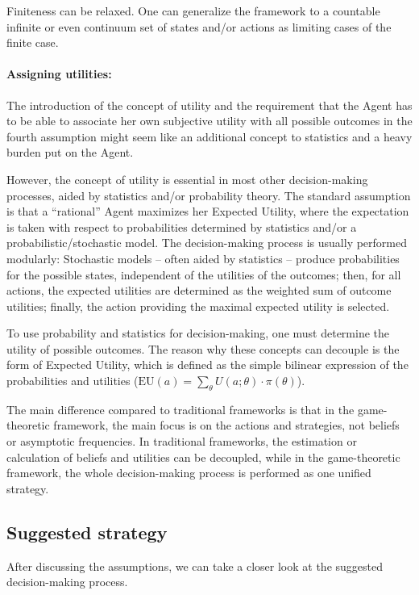 \documentclass{article}
\begin{document}
Finiteness can be relaxed. One can generalize the framework to a countable infinite or even continuum set of states and/or actions as limiting cases of the finite case.

\paragraph{Assigning utilities:}
The introduction of the concept of utility and the requirement that the Agent has to be able to associate her own subjective utility with all possible outcomes in the fourth assumption might seem like an additional concept to statistics and a heavy burden put on the Agent.

However, the concept of utility is essential in most other decision-making processes, aided by statistics and/or probability theory. The standard assumption is that a ``rational'' Agent maximizes her Expected Utility, where the expectation is taken with respect to probabilities determined by statistics and/or a probabilistic/stochastic model. The decision-making process is usually performed modularly: Stochastic models – often aided by statistics – produce probabilities for the possible states, independent of the utilities of the outcomes; then, for all actions, the expected utilities are determined as the weighted sum of outcome utilities; finally, the action providing the maximal expected utility is selected.

To use probability and statistics for decision-making, one must determine the utility of possible outcomes. The reason why these concepts can decouple is the form of Expected Utility, which is defined as the simple bilinear expression of the probabilities and utilities ($\mathrm{EU}(a)=\sum_\theta U(a;\theta) \cdot \pi(\theta)$).

The main difference compared to traditional frameworks is that in the game-theoretic framework, the main focus is on the actions and strategies, not beliefs or asymptotic frequencies.
In traditional frameworks, the estimation or calculation of beliefs and utilities can be decoupled, while in the game-theoretic framework, the whole decision-making process is performed as one unified strategy.

\subsection*{Suggested strategy}

After discussing the assumptions, we can take a closer look at the suggested decision-making process.
\end{document}
